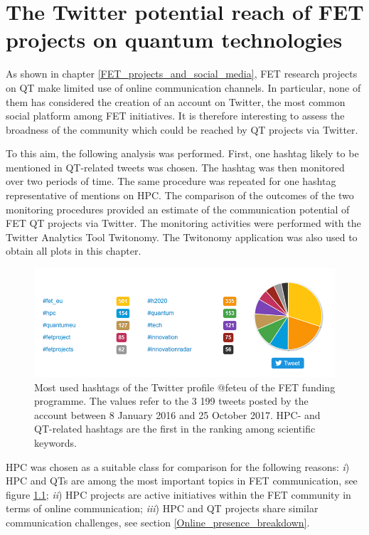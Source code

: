 \chapter{The Twitter potential reach of FET projects on quantum technologies}
As shown in chapter \ref{FET_projects_and_social_media}, FET research projects on QT make limited use of online communication channels. In particular, none of them has considered the creation of an account on Twitter, the most common social platform among FET initiatives. It is therefore interesting to assess the broadness of the community which could be reached by QT projects via Twitter.

To this aim, the following analysis was performed. First, one hashtag likely to be mentioned in QT-related tweets was chosen. The hashtag was then monitored over two periods of time. The same procedure was repeated for one hashtag representative of mentions on HPC. The comparison of the outcomes of the two monitoring procedures provided an estimate of the communication potential of FET QT projects via Twitter. The monitoring activities were performed with the Twitter Analytics Tool Twitonomy. The Twitonomy application was also used to obtain all plots in this chapter.

\begin{figure}[!t] 
 \begin{center}
 \includegraphics[scale=0.58]{Images/Hashtags_feteu.png}
 \caption{Most used hashtags of the Twitter profile @fet\textunderscore eu of the FET funding programme. The values refer to the 3 199 tweets posted by the account between 8 January 2016 and 25 October 2017. HPC- and QT-related hashtags are the first in the ranking among scientific keywords.}
 \label{Hashtags_feteu}
 \end{center}
\end{figure}

HPC was chosen as a suitable class for comparison for the following reasons: \textit{i}) HPC and QTs are among the most important topics in FET communication, see figure \ref{Hashtags_feteu}; \textit{ii}) HPC projects are active initiatives within the FET community in terms of online communication; \textit{iii}) HPC and QT projects share similar communication challenges, see section \ref{Online_presence_breakdown}.

